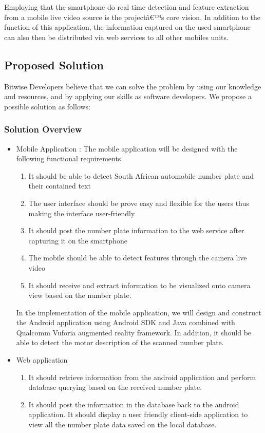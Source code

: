 \documentclass[a4paper]{article}
\begin{document}
Employing that the smartphone do real time detection and feature extraction from a mobile live video source is the projectâ€™s core vision. In addition to the function of this application, the information captured on the used smartphone can also then be distributed via web services to all other mobiles units.


		\subsection{Proposed Solution}

		Bitwise Developers believe that we can solve the problem by using our knowledge and 				resources, and by applying our skills as software developers.
		We propose a possible solution as follows:
		
			\subsubsection{Solution Overview}
			\begin{itemize}
			\item Mobile Application : The mobile application will be designed with the following        				functional requirements
			\begin{enumerate}
			\item It should be able to detect South African automobile number plate and their contained text
			\item The user interface should be prove easy and flexible for the users thus making the interface user-friendly
			\item It should post the number plate information to the web service after capturing it on the smartphone
			\item The mobile should be able to detect features through the camera live video
			\item It should receive and extract information to be visualized onto camera view based on the number plate.
			\end{enumerate}
			In the implementation of the mobile application, we will design and construct the Android application using Android SDK and Java combined with Qualcomm Vuforia augmented reality framework. In addition, it should be able to detect the motor description of the scanned number plate.
			\item Web application
			\begin{enumerate}
			\item It should retrieve information from the android application and perform database querying based on the received number plate.
			\item It should post the information in the database back to the android application.
It should display a user friendly client-side application to view all the number plate data saved on the local database.
			\end{enumerate}
			\end{itemize}	
\end{document}
